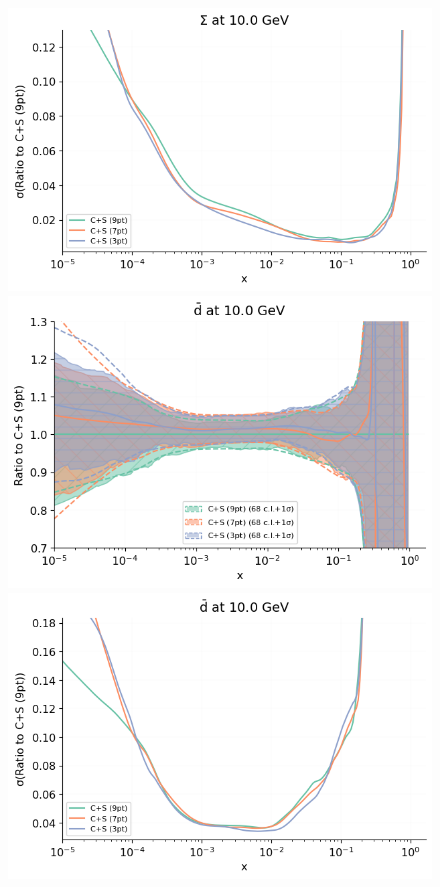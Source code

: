 \begin{figure}[H]
\begin{center}
    \includegraphics[scale=0.45]{mhous/plots/jplots/jesigma.png}
       \includegraphics[scale=0.45]{mhous/plots/jplots/j2d.png}
    \includegraphics[scale=0.45]{mhous/plots/jplots/jed.png}

\end{center}
\end{figure}
